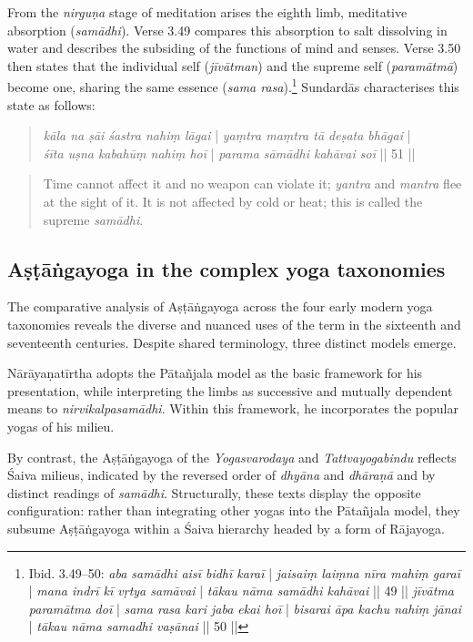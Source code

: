 From the \textit{nirguṇa} stage of meditation arises the eighth limb, meditative absorption (\textit{samādhi}). Verse 3.49 compares this absorption to salt dissolving in water and describes the subsiding of the functions of mind and senses. Verse 3.50 then states that the individual self (\textit{jīvātman}) and the supreme self (\textit{paramātmā}) become one, sharing the same essence (\textit{sama rasa}).\footnote{Ibid. 3.49–50: \textit{aba samādhi aisī bidhī karaī} | \textit{jaisaiṃ laiṃna nīra mahiṃ garaī} | \textit{mana indrī kī vṛtya samāvai} | \textit{tākau nāma samādhi kahāvai} || 49 || \textit{jīvātma paramātma doī} | \textit{sama rasa kari jaba ekai hoī} | \textit{bisarai āpa kachu nahiṃ jānai} | \textit{tākau nāma samadhi vaṣānai} || 50 ||} Sundardās characterises this state as follows:

\begin{quote}
\textit{kāla na ṣāi śastra nahiṃ lāgai} | \textit{yaṃtra maṃtra tā deṣata bhāgai} | \\
\textit{śīta uṣna kabahūṃ nahiṃ hoī} | \textit{parama sāmādhi kahāvai soī }|| 51 || 
\end{quote}\begin{quote}
Time cannot affect it and no weapon can violate it; \textit{yantra} and \textit{mantra} flee at the sight of it. It is not affected by cold or heat; this is called the supreme \textit{samādhi}.
\end{quote}

\subsection{Aṣṭāṅgayoga in the complex yoga taxonomies}

The comparative analysis of Aṣṭāṅgayoga across the four early modern yoga taxonomies reveals the diverse and nuanced uses of the term in the sixteenth and seventeenth centuries. Despite shared terminology, three distinct models emerge.

Nārāyaṇatīrtha adopts the Pātañjala model as the basic framework for his presentation, while interpreting the limbs as successive and mutually dependent means to \textit{nirvikalpasamādhi}. Within this framework, he incorporates the popular yogas of his milieu.

By contrast, the Aṣṭāṅgayoga of the \textit{Yogasvarodaya} and \textit{Tattvayogabindu} reflects Śaiva milieus, indicated by the reversed order of \textit{dhyāna} and \textit{dhāraṇā} and by distinct readings of \textit{samādhi}. Structurally, these texts display the opposite configuration: rather than integrating other yogas into the Pātañjala model, they subsume Aṣṭāṅgayoga within a Śaiva hierarchy headed by a form of Rājayoga.

